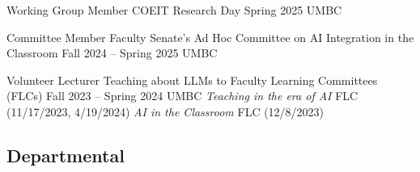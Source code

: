 \begin{cventries}
\cventry
    {Working Group Member}
    {COEIT Research Day}
    {Spring 2025}
    {UMBC}
    {}
    
 
\cventry
    {Committee Member}
    {Faculty Senate's Ad Hoc Committee on AI Integration in the Classroom}
    {Fall 2024 -- Spring 2025}
    {UMBC}
    {}
    
\cventry
    {Volunteer Lecturer}
    {Teaching about LLMs to Faculty Learning Committees (FLCs)}
    {Fall 2023 -- Spring 2024}
    {UMBC}
    {\textit{Teaching in the era of AI} FLC (11/17/2023, 4/19/2024)\newline
    \textit{AI in the Classroom} FLC (12/8/2023)}   
    
\end{cventries}



\subsection*{Departmental}


